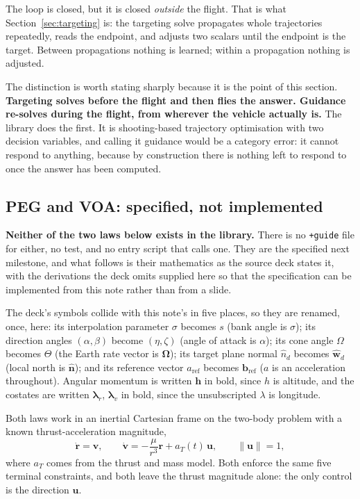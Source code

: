 \documentclass[11pt]{article}
\newcommand{\nhat}{\hat{\mathbf{n}}}
\newcommand{\bOmega}{\boldsymbol{\Omega}}
\newcommand{\code}[1]{\texttt{#1}}
\begin{document}
The loop is closed, but it is closed \emph{outside} the flight. That is what
Section~\ref{sec:targeting} is: the targeting solve propagates whole
trajectories repeatedly, reads the endpoint, and adjusts two scalars until the
endpoint is the target. Between propagations nothing is learned; within a
propagation nothing is adjusted.

The distinction is worth stating sharply because it is the point of this
section. \textbf{Targeting solves before the flight and then flies the answer.
Guidance re-solves during the flight, from wherever the vehicle actually is.}
The library does the first. It is shooting-based trajectory optimisation with
two decision variables, and calling it guidance would be a category error: it
cannot respond to anything, because by construction there is nothing left to
respond to once the answer has been computed.

\subsection{PEG and VOA: specified, not implemented}
\label{sec:pegvoa}

\textbf{Neither of the two laws below exists in the library.} There is no
\code{+guide} file for either, no test, and no entry script that calls one.
They are the specified next milestone, and what follows is their mathematics as
the source deck states it, with the derivations the deck omits supplied here so
that the specification can be implemented from this note rather than from a
slide.

The deck's symbols collide with this note's in five places, so they are
renamed, once, here: its interpolation parameter $\sigma$ becomes $s$ (bank
angle is $\sigma$); its direction angles $(\alpha,\beta)$ become $(\eta,\zeta)$
(angle of attack is $\alpha$); its cone angle $\Omega$ becomes $\Theta$ (the
Earth rate vector is $\bOmega$); its target plane normal $\hat n_d$ becomes
$\hat{\mathbf{w}}_d$ (local north is $\nhat$); and its reference vector
$a_{\text{ref}}$ becomes $\mathbf{b}_{\text{ref}}$ ($a$ is an acceleration
throughout). Angular momentum is written $\mathbf{h}$ in bold, since $h$ is
altitude, and the costates are written $\boldsymbol{\lambda}_r$,
$\boldsymbol{\lambda}_v$ in bold, since the unsubscripted $\lambda$ is
longitude.

Both laws work in an inertial Cartesian frame on the two-body problem with a
known thrust-acceleration magnitude,
\begin{equation}
  \dot{\mathbf{r}} = \mathbf{v},
  \qquad
  \dot{\mathbf{v}} = -\frac{\mu}{r^3}\mathbf{r} + a_T(t)\,\mathbf{u},
  \qquad \|\mathbf{u}\| = 1 ,
  \label{eq:guidetwobody}
\end{equation}
where $a_T$ comes from the thrust and mass model. Both enforce the same five
terminal constraints, and both leave the thrust magnitude alone: the only
control is the direction $\mathbf{u}$.
\end{document}

